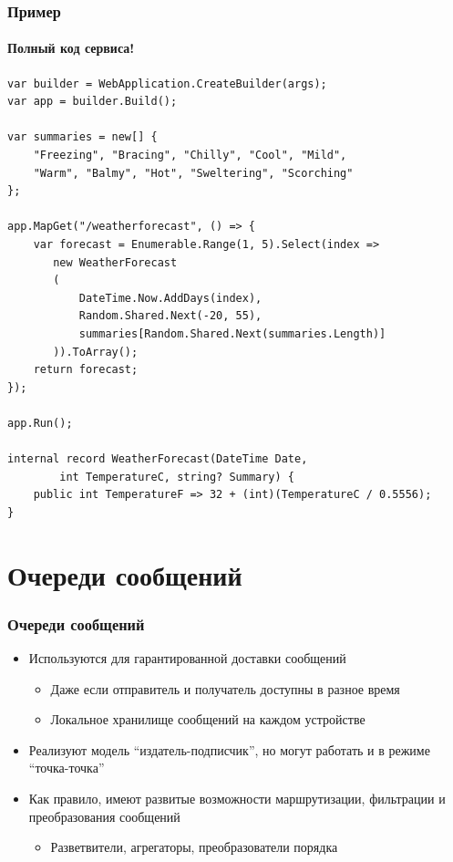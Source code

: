 \documentclass{../../slides-style}
\begin{document}
    \begin{frame}[fragile]
        \frametitle{Пример}
        \framesubtitle{Полный код сервиса!}
        \begin{ssmall}
            \begin{verbatim}
var builder = WebApplication.CreateBuilder(args);
var app = builder.Build();

var summaries = new[] {
    "Freezing", "Bracing", "Chilly", "Cool", "Mild", 
    "Warm", "Balmy", "Hot", "Sweltering", "Scorching"
};

app.MapGet("/weatherforecast", () => {
    var forecast = Enumerable.Range(1, 5).Select(index =>
       new WeatherForecast
       (
           DateTime.Now.AddDays(index),
           Random.Shared.Next(-20, 55),
           summaries[Random.Shared.Next(summaries.Length)]
       )).ToArray();
    return forecast;
});

app.Run();

internal record WeatherForecast(DateTime Date, 
        int TemperatureC, string? Summary) {
    public int TemperatureF => 32 + (int)(TemperatureC / 0.5556);
}
            \end{verbatim}
        \end{ssmall}
    \end{frame}

    \section{Очереди сообщений}

    \begin{frame}
        \frametitle{Очереди сообщений}
        \begin{itemize}
            \item Используются для гарантированной доставки сообщений
            \begin{itemize}
                \item Даже если отправитель и получатель доступны в разное время
                \item Локальное хранилище сообщений на каждом устройстве
            \end{itemize}
            \item Реализуют модель ``издатель-подписчик'', но могут работать и в режиме ``точка-точка''
            \item Как правило, имеют развитые возможности маршрутизации, фильтрации и преобразования сообщений
            \begin{itemize}
                \item Разветвители, агрегаторы, преобразователи порядка
            \end{itemize}
        \end{itemize}
    \end{frame}
\end{document}
